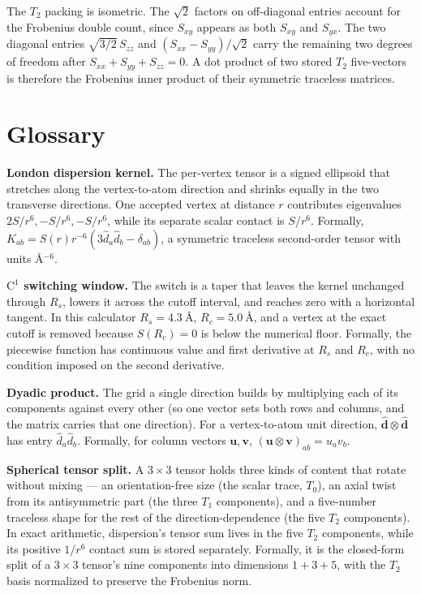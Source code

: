 \documentclass[11pt]{article}
\begin{document}
The \(T_2\) packing is isometric. The \(\sqrt2\) factors on off-diagonal
entries account for the Frobenius double count, since \(S_{xy}\) appears as
both \(S_{xy}\) and \(S_{yx}\). The two diagonal entries
\(\sqrt{3/2}\,S_{zz}\) and \((S_{xx}-S_{yy})/\sqrt2\) carry the remaining two
degrees of freedom after \(S_{xx}+S_{yy}+S_{zz}=0\). A dot product of two
stored \(T_2\) five-vectors is therefore the Frobenius inner product of their
symmetric traceless matrices.

\section{Glossary}

\textbf{London dispersion kernel.} The per-vertex tensor is a signed ellipsoid
that stretches along the vertex-to-atom direction and shrinks equally in the
two transverse directions. One accepted vertex at distance \(r\) contributes
eigenvalues \(2S/r^6,-S/r^6,-S/r^6\), while its separate scalar contact is
\(S/r^6\). Formally,
\(K_{ab}=S(r)r^{-6}(3\hat d_a\hat d_b-\delta_{ab})\), a symmetric traceless
second-order tensor with units \(\si{\angstrom^{-6}}\).

\textbf{\(\mathrm C^1\) switching window.} The switch is a taper that leaves
the kernel unchanged through \(R_s\), lowers it across the cutoff interval, and
reaches zero with a horizontal tangent. In this calculator
\(R_s=\SI{4.3}{\angstrom}\), \(R_c=\SI{5.0}{\angstrom}\), and a vertex at the
exact cutoff is removed because \(S(R_c)=0\) is below the numerical floor.
Formally, the piecewise function has continuous value and first derivative at
\(R_s\) and \(R_c\), with no condition imposed on the second derivative.

\textbf{Dyadic product.} The grid a single direction builds by multiplying each
of its components against every other (so one vector sets both rows and columns,
and the matrix carries that one direction). For a vertex-to-atom unit direction,
\(\hat{\bm d}\otimes\hat{\bm d}\) has entry \(\hat d_a\hat d_b\). Formally, for
column vectors \(\bm u,\bm v\), \((\bm u\otimes\bm v)_{ab}=u_av_b\).

\textbf{Spherical tensor split.} A \(3\times3\) tensor holds three kinds of
content that rotate without mixing --- an orientation-free size (the scalar
trace, \(T_0\)), an axial twist from its antisymmetric part (the three \(T_1\)
components), and a five-number traceless shape for the rest of the
direction-dependence (the five \(T_2\) components). In exact arithmetic, dispersion's tensor sum lives in
the five \(T_2\) components, while its positive \(1/r^6\) contact sum is stored
separately. Formally, it is the closed-form split of a \(3\times3\) tensor's
nine components into dimensions \(1+3+5\), with the \(T_2\) basis normalized to
preserve the Frobenius norm.
\end{document}
